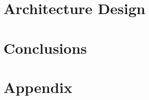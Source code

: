 \documentclass{report}
\begin{document}
\chapter{Architecture Design}


% 

% 

\chapter{Conclusions}


{}


\chapter{Appendix}

\end{document}
